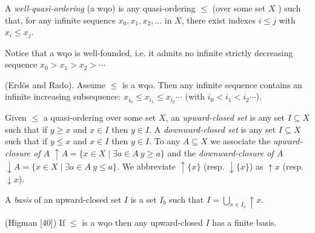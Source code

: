 \begin{definition}
 A {\em well-quasi-ordering} (a wqo) is any quasi-ordering $\leq$ (over some set $X$ ) such that, for any infinite sequence $x_0, x_1, x_2, ...$ in $X$, there exist indexes $i \leq j$ with
$x_i \leq  x_j$.
\end{definition}

Notice that a wqo is well-founded, i.e. it admits no infinite strictly decreasing sequence
$x_0 > x_1 > x_2 > \cdots$


\begin{lemma}
(Erd\"os and Rado). Assume $\leq$ is a wqo. Then any infinite sequence contains an infinite increasing subsequence: $x_{i_0} \leq x_{i_1} \leq x_{i_2} \cdots$ (with $i_0 < i_1 < i_2 \cdots$).
\end{lemma}

\iffalse
\begin{proof}
Consider an infinite sequence and the set $M = \{i \in N \mid \forall j > i ~ x_i \not\leq x_j \}$. $M$ cannot
be infinite, otherwise it would lead to an infinite subsequence contradicting the wqo
hypothesis. Thus, $M$ is bounded and any $x_i$ with $i$ beyond $M$ can start an infinite
increasing subsequence.
\end{proof}
\fi


Given $\leq$ a quasi-ordering over some set $X$, an {\em upward-closed set} is any set $I \subseteq X$ such that if $y \geq x$ and $x \in I$ then $y \in I $.
A {\em downward-closed set} is any set $I \subseteq X$ such that if $y \leq x$ and $x \in I$ then $y \in I $. 
To any $A \subseteq X$ we associate
the {\em upward-closure of $A$} 
 $\uparrow A = \{x \in X \mid \exists a \in A ~ y \geq a\}$
 and the 
 {\em downward-closure of $A$} 
 $\downarrow A = \{x \in X \mid \exists a \in A ~ y \leq a\}$. 
We abbreviate $\uparrow \{x\}$ (resp. $\downarrow \{x\}$)
as $\uparrow x$ (resp. $\downarrow x$).


A {\em basis} of an upward-closed set $I$ is a set $I_b$ such that $I = \bigcup_{x \in I_b} \uparrow x$. 


\begin{lemma}{(Higman [40])} 
If $\leq$ is a wqo then any upward-closed $I$ has a
finite basis.
\end{lemma}


